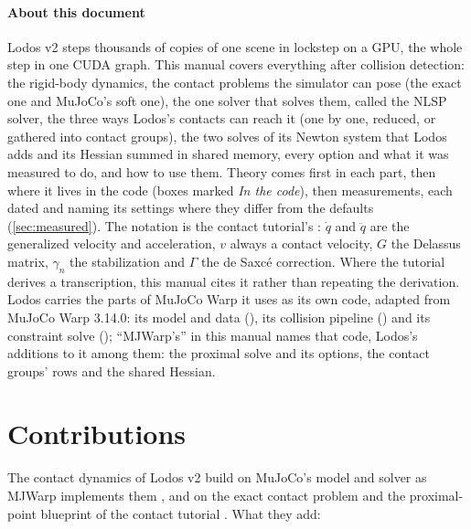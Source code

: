 



\paragraph{About this document}
Lodos v2 steps thousands of copies of one scene in lockstep on a GPU, the whole step in one CUDA graph. This manual covers everything after collision detection: the rigid-body dynamics, the contact problems the simulator can pose (the exact one and MuJoCo's soft one), the one solver that solves them, called the NLSP solver, the three ways Lodos's contacts can reach it (one by one, reduced, or gathered into contact groups), the two solves of its Newton system that Lodos adds and its Hessian summed in shared memory, every option and what it was measured to do, and how to use them. Theory comes first in each part, then where it lives in the code (boxes marked \emph{In the code}), then measurements, each dated and naming its settings where they differ from the defaults (\cref{sec:measured}). The notation is the contact tutorial's \cite{tutorial}: $\dot q$ and $\ddot q$ are the generalized velocity and acceleration, $v$ always a contact velocity, $G$ the Delassus matrix, $\gamma_n$ the stabilization and $\Gamma$ the de Saxc\'e correction. Where the tutorial derives a transcription, this manual cites it rather than repeating the derivation. Lodos carries the parts of MuJoCo Warp \cite{mjwarp} it uses as its own code, adapted from MuJoCo Warp 3.14.0: its model and data (), its collision pipeline () and its constraint solve (); ``MJWarp's'' in this manual names that code, Lodos's additions to it among them: the proximal solve and its  options, the contact groups' rows and the shared Hessian.

\setcounter{tocdepth}{2}
\tableofcontents

\section{Contributions}\label{sec:contributions}

The contact dynamics of Lodos v2 build on MuJoCo's model and solver \cite{mujoco,todorov2014} as MJWarp implements them \cite{mjwarp}, and on the exact contact problem and the proximal-point blueprint of the contact tutorial \cite{tutorial}. What they add:

